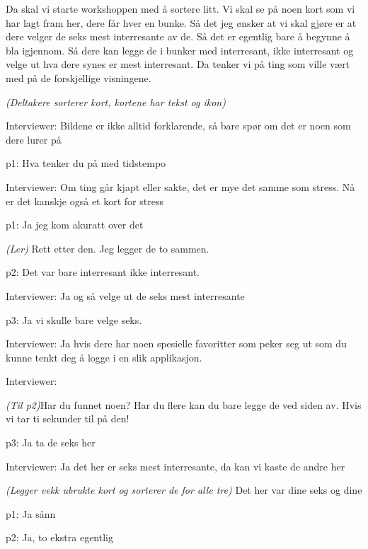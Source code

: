 \documentclass[11pt, norsk, a4paper]{article}
\begin{document}
Da skal vi starte workshoppen med å sortere litt. Vi skal se på noen kort som vi har lagt fram her, dere får hver en bunke. Så det jeg ønsker at vi skal gjøre er at dere velger de seks mest interresante av de. Så det er egentlig bare å begynne å bla igjennom. Så dere kan legge de i bunker med interresant, ikke interresant og velge ut hva dere synes er mest interresant. Da tenker vi på ting som ville vært med på de forskjellige visningene.



\textcolor{myGrey}{\textit{(Deltakere sorterer kort, kortene har tekst og ikon)}}


\textcolor{myBlue} {Interviewer: }Bildene er ikke alltid forklarende, så bare spør om det er noen som dere lurer på


\textcolor{myGreen} {p1: }Hva tenker du på med tidstempo


\textcolor{myBlue} {Interviewer: }Om ting går kjapt eller sakte, det er mye det samme som stress. Nå er det kanskje også et kort for stress


\textcolor{myGreen} {p1: }Ja jeg kom akuratt over det 

\textcolor{myGrey}{\textit{(Ler)}} Rett etter den. Jeg legger de to sammen.


\textcolor{myYellow} {p2: }Det var bare interresant ikke interresant.


\textcolor{myBlue} {Interviewer: }Ja og så velge ut de seks mest interresante


\textcolor{myR} {p3: }Ja vi skulle bare velge seks.


\textcolor{myBlue} {Interviewer: }Ja hvis dere har noen spesielle favoritter som peker seg ut som du kunne tenkt deg å logge i en slik applikasjon.


\textcolor{myBlue} {Interviewer: }

\textcolor{myGrey}{\textit{(Til p2)}}Har du funnet noen? Har du flere kan du bare legge de ved siden av. Hvis vi tar ti sekunder til på den! 


\textcolor{myR} {p3: }Ja ta de seks her


\textcolor{myBlue} {Interviewer: }Ja det her er seks mest interresante, da kan vi kaste de andre her 

\textcolor{myGrey}{\textit{(Legger vekk ubrukte kort og sorterer de for alle tre)}} Det her var dine seks og dine


\textcolor{myGreen} {p1: }Ja sånn


\textcolor{myYellow} {p2: }Ja, to ekstra egentlig
\end{document}

